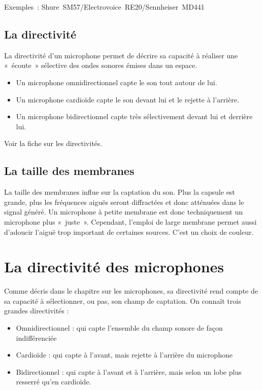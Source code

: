 \documentclass[
]{book}
\providecommand{\tightlist}{%
  \setlength{\itemsep}{0pt}\setlength{\parskip}{0pt}}
\begin{document}
Exemples~: Shure~SM57/Electrovoice~RE20/Sennheiser~MD441

\hypertarget{la-directivituxe9}{%
\section{La directivité}\label{la-directivituxe9}}

La directivité d'un microphone permet de décrire sa capacité à réaliser une «~écoute~» sélective des ondes sonores émises dans un espace.

\begin{itemize}
\tightlist
\item
  Un microphone omnidirectionnel capte le son tout autour de lui.
\item
  Un microphone cardioïde capte le son devant lui et le rejette à l'arrière.
\item
  Un microphone bidirectionnel capte très sélectivement devant lui et derrière lui.
\end{itemize}

Voir la fiche sur les directivités.

\hypertarget{la-taille-des-membranes}{%
\section{La taille des membranes}\label{la-taille-des-membranes}}

La taille des membranes influe sur la captation du son. Plus la capsule est grande, plus les fréquences aiguës seront diffractées et donc atténuées dans le signal généré.
Un microphone à petite membrane est donc techniquement un microphone plus «~juste~». Cependant, l'emploi de large membrane permet aussi d'adoucir l'aiguë trop important de certaines sources. C'est un choix de couleur.

\hypertarget{la-directivituxe9-des-microphones}{%
\chapter{La directivité des microphones}\label{la-directivituxe9-des-microphones}}

Comme décris dans le chapitre sur les microphones, sa directivité rend compte de sa capacité à sélectionner, ou pas, son champ de captation. On connaît trois grandes directivités :

\begin{itemize}
\tightlist
\item
  Omnidirectionnel : qui capte l'ensemble du champ sonore de façon indifférenciée
\item
  Cardioïde : qui capte à l'avant, mais rejette à l'arrière du microphone
\item
  Bidirectionnel : qui capte à l'avant et à l'arrière, mais selon un lobe plus resserré qu'en cardioïde.
\end{itemize}
\end{document}
